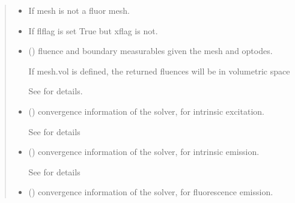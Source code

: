 \documentclass[letterpaper,10pt,english]{sphinxmanual}
\begin{document}
\begin{fulllineitems}
\begin{quote}
\begin{description}
\begin{itemize}
\end{itemize}

\begin{itemize}
\item {} 
\sphinxAtStartPar
{} \textendash{} If mesh is not a fluor mesh.

\item {} 
\sphinxAtStartPar
{} \textendash{} If flflag is set True but xflag is not.

\end{itemize}

\sphinxAtStartPar
\begin{itemize}
\item {} 
\sphinxAtStartPar
{} () \textendash{} fluence and boundary measurables given the mesh and optodes.

\sphinxAtStartPar
If mesh.vol is defined, the returned fluences will be in volumetric space

\sphinxAtStartPar
See {\hyperref[\detokenize{_autosummary/nirfasterff.base.data.FLdata:nirfasterff.base.data.FLdata}]{}} for details.

\item {} 
\sphinxAtStartPar
{} () \textendash{} convergence information of the solver, for intrinsic excitation.

\sphinxAtStartPar
See {\hyperref[\detokenize{_autosummary/nirfasterff.utils.ConvergenceInfo:nirfasterff.utils.ConvergenceInfo}]{}} for details

\item {} 
\sphinxAtStartPar
{} () \textendash{} convergence information of the solver, for intrinsic emission.

\sphinxAtStartPar
See {\hyperref[\detokenize{_autosummary/nirfasterff.utils.ConvergenceInfo:nirfasterff.utils.ConvergenceInfo}]{}} for details

\item {} 
\sphinxAtStartPar
{} () \textendash{} convergence information of the solver, for fluorescence emission.


\end{itemize}
\end{description}
\end{quote}
\end{fulllineitems}
\end{document}
